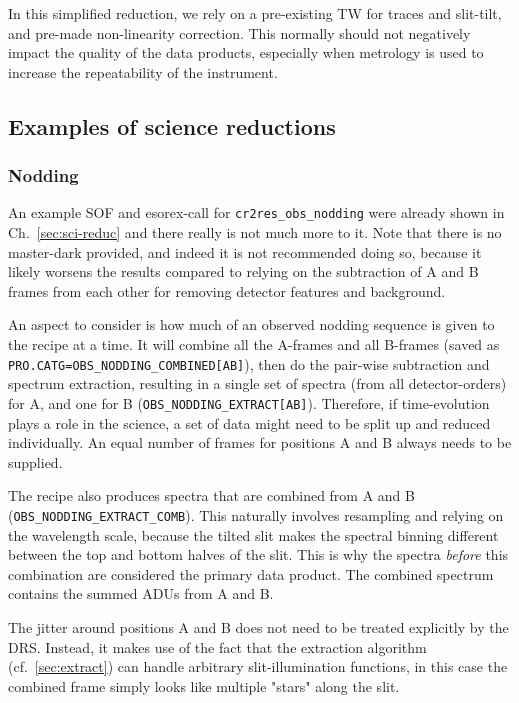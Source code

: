 In this simplified reduction, we rely on a pre-existing TW for traces and slit-tilt, and pre-made non-linearity correction. This normally should not negatively impact the quality of the data products, especially when metrology is used to increase the repeatability of the instrument.

\subsection{Examples of science reductions}

\subsubsection{Nodding}
\label{sec:nodding}
An example SOF and esorex-call for \verb!cr2res_obs_nodding! were already shown
in Ch.~\ref{sec:sci-reduc} and there really is not much more to it. Note that
there is no master-dark provided, and indeed it is not recommended doing so,
because it likely worsens the results compared to relying on the subtraction of
A and B frames from each other for removing detector features and background.

An aspect to consider is how much of an observed nodding sequence is given to
the recipe at a time. It will combine all the A-frames and all B-frames (saved
as \verb!PRO.CATG=OBS_NODDING_COMBINED[AB]!), then do the pair-wise subtraction
and spectrum extraction, resulting in a single set of spectra (from all
detector-orders) for A, and one for B (\verb!OBS_NODDING_EXTRACT[AB]!).
Therefore, if time-evolution plays a role in the science, a set of data might
need to be split up and reduced individually. An equal number of frames for
positions A and B always needs to be supplied.

The recipe also produces spectra that are combined from A and B
(\verb!OBS_NODDING_EXTRACT_COMB!). This naturally involves resampling and
relying on the wavelength scale, because the tilted slit makes the spectral
binning different between the top and bottom halves of the slit. This is why the
spectra \emph{before} this combination are considered the primary data product.
The combined spectrum contains the summed ADUs from A and B.

The jitter around positions A and B does not need to be treated explicitly by
the DRS. Instead, it makes use of the fact that the extraction algorithm
(cf.~\ref{sec:extract}) can handle arbitrary slit-illumination functions, in
this case the combined frame simply looks like multiple "stars" along the slit.

